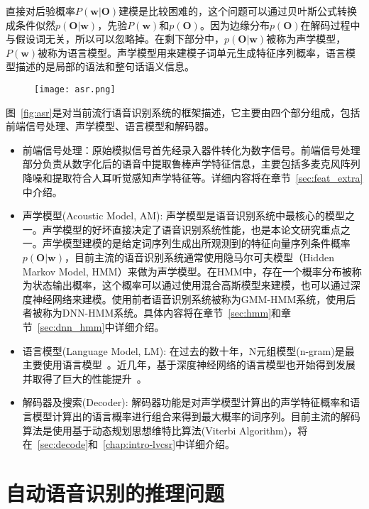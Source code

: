 直接对后验概率$P(\mathbf{w}|\mathbf{O})$建模是比较困难的，这个问题可以通过贝叶斯公式转换成条件似然$p(\mathbf{O}|\mathbf{w})$，先验$P(\mathbf{w})$和$p(\mathbf{O})$。因为边缘分布$p(\mathbf{O})$在解码过程中与假设词无关，所以可以忽略掉。在剩下部分中，$p(\mathbf{O}|\mathbf{w})$被称为声学模型，$P(\mathbf{w})$被称为语言模型。声学模型用来建模子词单元生成特征序列概率，语言模型描述的是局部的语法和整句话语义信息。

\begin{figure}[!htp]
  \centering
    \captionstyle{\centering}
    \texttt{[image: asr.png]}
\end{figure}

图~\ref{fig:asr}是对当前流行语音识别系统的框架描述，它主要由四个部分组成，包括前端信号处理、声学模型、语言模型和解码器。
\begin{itemize}
    \item 前端信号处理：原始模拟信号首先经录入器件转化为数字信号。前端信号处理部分负责从数字化后的语音中提取鲁棒声学特征信息，主要包括多麦克风阵列降噪和提取符合人耳听觉感知声学特征等。详细内容将在章节~\ref{sec:feat_extra}中介绍。
    \item 声学模型(Acoustic Model, AM): 声学模型是语音识别系统中最核心的模型之一。声学模型的好坏直接决定了语音识别系统性能，也是本论文研究重点之一。声学模型建模的是给定词序列生成出所观测到的特征向量序列条件概率$p(\mathbf{O}|\mathbf{w})$，目前主流的语音识别系统通常使用隐马尔可夫模型（Hidden Markov Model, HMM）来做为声学模型。在HMM中，存在一个概率分布被称为状态输出概率，这个概率可以通过使用混合高斯模型来建模，也可以通过深度神经网络来建模。使用前者语音识别系统被称为GMM-HMM系统，使用后者被称为DNN-HMM系统。具体内容将在章节~\ref{sec:hmm}和章节~\ref{sec:dnn_hmm}中详细介绍。
    \item 语言模型(Language Model, LM): 在过去的数十年，N元组模型(n-gram)是最主要使用语言模型~\cite{good1953population,katz1987estimation,brown1992class}。近几年，基于深度神经网络的语言模型也开始得到发展并取得了巨大的性能提升~\cite{mikolov2010recurrent,mikolov2012statistical}。
    \item 解码器及搜索(Decoder): 解码器功能是对声学模型计算出的声学特征概率和语言模型计算出的语言概率进行组合来得到最大概率的词序列。目前主流的解码算法是使用基于动态规划思想维特比算法(Viterbi Algorithm)，将在~\ref{sec:decode}和~\ref{chap:intro-lvcsr}中详细介绍。
\end{itemize}

\section{自动语音识别的推理问题}
\label{chap:intro0-inf}

